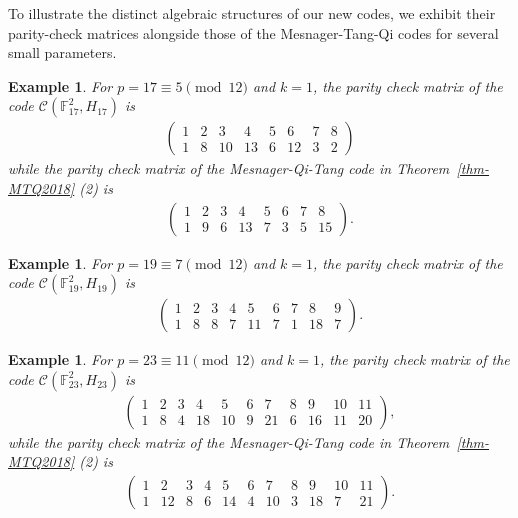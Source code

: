 \documentclass{amsart}
\newtheorem{example}[theorem]{Example}
\numberwithin{equation}{section}
\newcommand{\F}{\mathbb{F}}
\begin{document}
To illustrate the distinct algebraic structures of our new codes, we exhibit their parity-check matrices alongside those of the Mesnager-Tang-Qi codes for several small parameters.

\begin{example}
For $p=17 \equiv 5 \pmod{12}$ and $k=1$, the parity check matrix of the code $\mathcal{C}(\F_{17}^2, H_{17})$ is
\begin{align*}
    \begin{pmatrix}
1 & 2 & 3 & 4 & 5 & 6 & 7 & 8 \\
1 & 8 & 10 & 13 & 6 & 12 & 3 & 2
\end{pmatrix}
\end{align*}
while the parity check matrix of the Mesnager-Qi-Tang code in Theorem~\ref{thm-MTQ2018} (2) is  
\begin{align*}
\begin{pmatrix}
1 & 2 & 3 & 4 & 5 & 6 & 7 & 8 \\
1 & 9 & 6 & 13 & 7 & 3 & 5 & 15
\end{pmatrix}.
\end{align*}
\end{example}

\begin{example}
For $p=19 \equiv 7 \pmod{12}$ and $k=1$, the parity check matrix of the code $\mathcal{C}(\F_{19}^2, H_{19})$ is
\begin{align*}
    \begin{pmatrix}
1 & 2 & 3 & 4 & 5 & 6 & 7 & 8 & 9 \\
1 & 8 & 8 & 7 & 11 & 7 & 1 & 18 & 7  
\end{pmatrix}.
\end{align*}
\end{example}

\begin{example}
For $p=23 \equiv 11 \pmod{12}$ and $k=1$, the parity check matrix of the code $\mathcal{C}(\F_{23}^2, H_{23})$ is
\begin{align*}
\begin{pmatrix}
1 & 2 & 3 & 4 & 5 & 6 & 7 & 8 & 9 & 10 & 11 \\
1 & 8 & 4 & 18 & 10 & 9 & 21 & 6 & 16 & 11 & 20
\end{pmatrix},
\end{align*}
while the parity check matrix of the Mesnager-Qi-Tang code in Theorem~\ref{thm-MTQ2018} (2) is  
\begin{align*}
\begin{pmatrix}
1 & 2 & 3 & 4 & 5 & 6 & 7 & 8 & 9 & 10 & 11 \\
1 & 12 & 8 & 6 & 14 & 4 & 10 & 3 & 18 & 7 & 21
\end{pmatrix}.
\end{align*}
\end{example}
\end{document}
